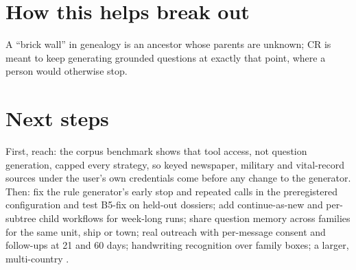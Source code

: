 \section{How this helps break out}
\label{sec:breakout}
A ``brick wall'' in genealogy is an ancestor whose parents are unknown; CR is meant to keep generating grounded questions at exactly that point, where a person would otherwise stop.

\section{Next steps}
\label{sec:future}
First, reach: the corpus benchmark shows that tool access, not question generation, capped every strategy, so keyed newspaper, military and vital-record sources under the user's own credentials come before any change to the generator. Then: fix the rule generator's early stop and repeated calls in the preregistered configuration and test B5-fix on held-out dossiers; add continue-as-new and per-subtree child workflows for week-long runs; share question memory across families for the same unit, ship or town; real outreach with per-message consent and follow-ups at 21 and 60 days; handwriting recognition over family boxes; a larger, multi-country \bench.
